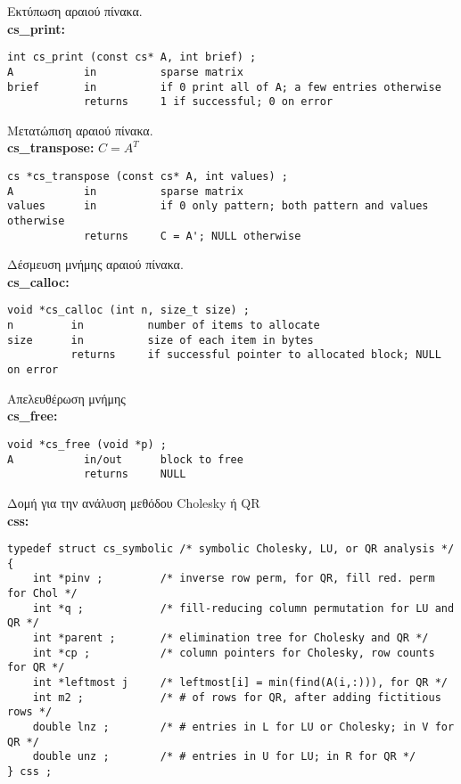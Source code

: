 Εκτύπωση αραιού πίνακα.\\
\textbf{cs\_print:}
\begin{verbatim}
int cs_print (const cs* A, int brief) ;
A           in          sparse matrix
brief       in          if 0 print all of A; a few entries otherwise
            returns     1 if successful; 0 on error
\end{verbatim}

Μετατώπιση αραιού πίνακα.\\
\textbf{cs\_transpose:} $C = A^T$
\begin{verbatim}
cs *cs_transpose (const cs* A, int values) ;
A           in          sparse matrix
values      in          if 0 only pattern; both pattern and values otherwise
            returns     C = A'; NULL otherwise
\end{verbatim}


Δέσμευση μνήμης αραιού πίνακα.\\
\textbf{cs\_calloc:}
\begin{verbatim}
void *cs_calloc (int n, size_t size) ;
n         in          number of items to allocate
size      in          size of each item in bytes
          returns     if successful pointer to allocated block; NULL on error
\end{verbatim}

Απελευθέρωση μνήμης\\
\textbf{cs\_free:}
\begin{verbatim}
void *cs_free (void *p) ;
A           in/out      block to free
            returns     NULL
\end{verbatim}

Δομή για την ανάλυση μεθόδου  Cholesky ή  QR \\
\textbf{css:}
\begin{verbatim}
typedef struct cs_symbolic /* symbolic Cholesky, LU, or QR analysis */
{
    int *pinv ;         /* inverse row perm, for QR, fill red. perm for Chol */
    int *q ;            /* fill-reducing column permutation for LU and QR */
    int *parent ;       /* elimination tree for Cholesky and QR */
    int *cp ;           /* column pointers for Cholesky, row counts for QR */
    int *leftmost j     /* leftmost[i] = min(find(A(i,:))), for QR */
    int m2 ;            /* # of rows for QR, after adding fictitious rows */
    double lnz ;        /* # entries in L for LU or Cholesky; in V for QR */
    double unz ;        /* # entries in U for LU; in R for QR */
} css ;
\end{verbatim}

